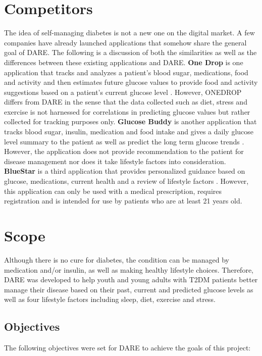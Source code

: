 
\section{Competitors}
\label{sec:competitors}
The idea of self-managing diabetes is not a new one on the digital market. A few companies have already launched applications that somehow share the general goal of DARE. 
The following is a discussion of both the similarities as well as the differences between these existing applications and DARE.
\bigbreak
\textbf{One Drop} is one application that tracks and analyzes a patient's blood sugar, medications, food and activity and then estimates future glucose values to provide food and activity suggestions based on a patient's current glucose level \cite{4}. However, ONEDROP differs from DARE in the sense that the data collected such as diet, stress and exercise is not harnessed for correlations in predicting glucose values but rather collected for tracking purposes only.
\bigbreak
\textbf{Glucose Buddy} is another application that tracks blood sugar, insulin, medication and food intake and gives a daily glucose level summary to the patient as well as predict the long term glucose trends \cite{5}. However, the application does not provide recommendation to the patient for disease management nor does it take lifestyle factors into consideration.
\bigbreak
\textbf{BlueStar} is a third application that provides personalized guidance based on glucose, medications, current health and a review of lifestyle factors \cite{6}. However, this application can only be used with a medical prescription, requires registration and is intended for use by patients who are at least 21 years old. 



\section{Scope}
\label{sec:scope}
Although there is no cure for diabetes, the condition can be managed by medication and/or insulin, as well as making healthy lifestyle choices. Therefore, DARE was developed to help youth and young adults with T2DM patients better manage their disease based on their past, current and predicted glucose levels as well as four lifestyle factors including sleep, diet, exercise and stress.

\subsection{Objectives}
\label{subsec:objectives}
The following objectives were set for DARE to achieve the goals of this project:

